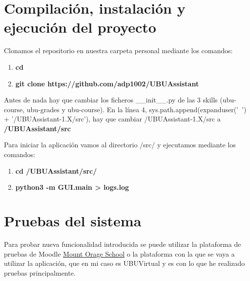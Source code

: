 \section{Compilación, instalación y ejecución del proyecto}

Clonamos el repositorio en nuestra carpeta personal mediante los comandos:
\begin{enumerate}
	\item \textbf{cd \detokenize{~}}
	\item \textbf{git clone https://github.com/adp1002/UBUAssistant}
\end{enumerate}

Antes de nada hay que cambiar los ficheros \_\_init\_\_.py de las 3 skills (ubu-course, ubu-grades y ubu-course). En la línea 4, sys.path.append(expanduser('~') + '/UBUAssistant-1.X/src'), hay que cambiar /UBUAssistant-1.X/src a \textbf{/UBUAssistant/src}

Para iniciar la aplicación vamos al directorio /src/ y ejecutamos mediante los comandos:
\begin{enumerate}
	\item \textbf{cd \detokenize{~}/UBUAssistant/src/}
	\item \textbf{python3 -m GUI.main \detokenize{>}> logs.log}
\end{enumerate}

\section{Pruebas del sistema}

Para probar nueva funcionalidad introducida se puede utilizar la plataforma de pruebas de Moodle \href{https://school.moodledemo.net/}{Mount Orage School} o la plataforma con la que se vaya a utilizar la aplicación, que en mi caso es UBUVirtual y es con lo que he realizado pruebas principalmente.